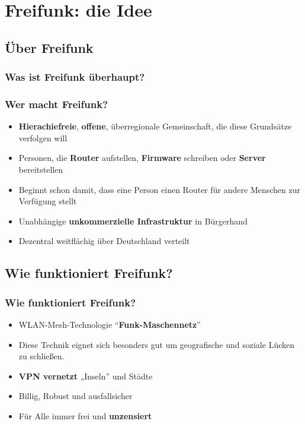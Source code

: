 \section{Freifunk: die Idee}
\subsection{Über Freifunk}

\begin{frame}
\frametitle{Was ist Freifunk überhaupt?}
\end{frame}

\begin{frame}
\frametitle{Wer macht Freifunk?}
\begin{itemize}
\item \textbf{Hierachiefreie}, \textbf{offene}, überregionale Gemeinschaft, die diese Grundsätze verfolgen will
\item Personen, die \textbf{Router} aufstellen, \textbf{Firmware} schreiben oder \textbf{Server} bereitstellen
\item Beginnt schon damit, dass eine Person einen Router für andere Menschen zur Verfügung stellt
\item Unabhängige \textbf{unkommerzielle Infrastruktur} in Bürgerhand
\item Dezentral weitflächig über Deutschland verteilt
\end{itemize}
\end{frame}

\subsection{Wie funktioniert Freifunk?}

\begin{frame}
\frametitle{Wie funktioniert Freifunk?}
\begin{itemize}
\item WLAN-Mesh-Technologie “\textbf{Funk-Maschennetz}”
\item Diese Technik eignet sich besonders gut um geografische und soziale Lücken zu schließen.
\item \textbf{VPN vernetzt} „Inseln” und Städte
\item Billig, Robust und ausfallsicher
\item Für Alle immer frei und \textbf{unzensiert}
\end{itemize}
\end{frame}


